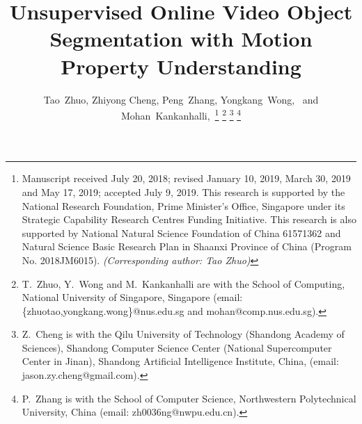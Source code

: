 \documentclass[journal]{IEEEtran}
\begin{document}
\title
	{
	Unsupervised Online Video Object Segmentation with Motion Property Understanding
	}

\author
	{Tao~Zhuo,
	 Zhiyong Cheng,
	 Peng~Zhang, 
	 Yongkang~Wong,~
	 and Mohan~Kankanhalli,~\thanks{Manuscript received July 20, 2018; revised January 10, 2019, March 30, 2019 and May 17, 2019; accepted July 9, 2019. This research is supported by the National Research Foundation, Prime Minister's Office, Singapore under its Strategic Capability Research Centres Funding Initiative. This research is also supported by National Natural Science Foundation of China 61571362 and Natural Science Basic Research Plan in Shaanxi Province of China (Program No. 2018JM6015). \emph{(Corresponding author: Tao Zhuo)}}
		\thanks{T.~Zhuo, Y.~Wong and M.~Kankanhalli are with the School of Computing, National University of Singapore, Singapore (email: \{zhuotao,yongkang.wong\}@nus.edu.sg and mohan@comp.nus.edu.sg).}
		\thanks{Z.~Cheng is with the Qilu University of Technology (Shandong Academy of Sciences), Shandong Computer Science Center (National Supercomputer Center in Jinan), Shandong Artificial Intelligence Institute, China, (email: jason.zy.cheng@gmail.com).}
		\thanks{P.~Zhang is with the School of Computer Science, Northwestern Polytechnical University, China (email: zh0036ng@nwpu.edu.cn).}
	}




\maketitle


\IEEEpeerreviewmaketitle
\end{document}
